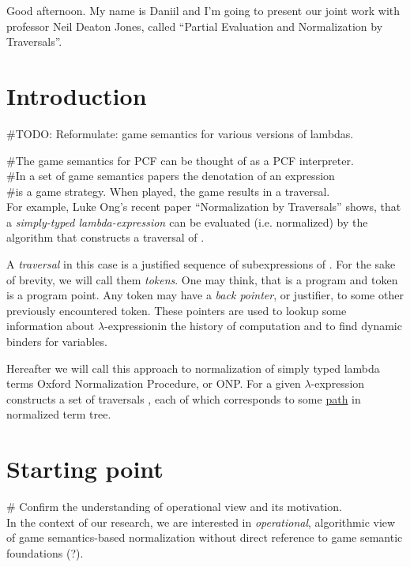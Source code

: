 \documentclass[a4paper, 10pt]{article}
\newcommand{\red}[1]{{\color{red}#1}}
\newcommand{\green}[1]{{\color{blue!20!black!30!green}#1}}
\newcommand{\blue}[1]{{\color{blue}#1}}
\newcommand{\lam}[1]{{\color{brown}\emph{\boldmath{#1}}}}
\newcommand{\lexp}{$\lambda$-expression}
\begin{document}
Good afternoon. My name is Daniil and I'm going to present our joint work with 
professor Neil Deaton Jones, called ``Partial Evaluation and Normalization by 
Traversals''. 


\section{Introduction}

\#TODO:
Reformulate: game semantics for various versions of lambdas.

\#The game semantics for PCF can be thought of as a PCF interpreter.\\
\#In a set of game semantics papers the denotation of an expression\\
\#is a game strategy. When played, the game results in a traversal.\\

For example, Luke Ong’s recent paper ``Normalization by Traversals''
shows, that a \blue{\emph{simply-typed lambda-expression \lam{M}}}
can be \red{evaluated} (i.e. normalized) by the algorithm that
constructs a \green{traversal} of \lam{M}.

A \green{\emph{traversal}} in this case is a justified sequence
of subexpressions of \lam{M}. For the sake of brevity, we will call them
\green{\emph{tokens}}. One may think, that \lam{$M$} is 
a \blue{program} and token is a \blue{program point}. Any token
may have a \green{\emph{back pointer}}, or justifier, to some other 
previously encountered token. These pointers are used to lookup some 
information about \lexp in the history of computation and to find
dynamic binders for variables.

Hereafter we will call this approach to normalization of simply typed
lambda terms Oxford Normalization Procedure, or ONP. For a given \lexp
\lam{$M$} \lam{ONP} constructs a set of traversals
\lam{$\mathfrak{Trav}(M)$}, each of which corresponds to some
\underline{path} in normalized term tree.


\section{Starting point}

\# Confirm the understanding of operational view and its motivation.\\
In the context of our research, we are interested in \emph{operational}, 
algorithmic view of game semantics-based normalization without direct
reference to game semantic foundations (?).
\end{document}
